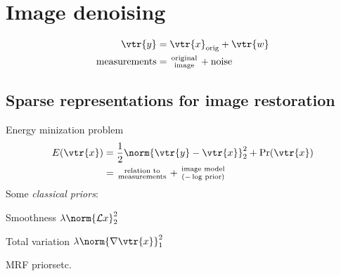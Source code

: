 \chapter{Image denoising}
\begin{align*}
	\vtr{y}&=\vtr{x}_{\text{orig}}+\vtr{w}\\
	\text{measurements}&=
	\begin{smallmatrix}
		\text{original}\\
		\text{image}
	\end{smallmatrix}
	+\text{noise}
\end{align*}
\section{Sparse representations for image restoration}
\begin{compactdesc}
\item[\lp{MAP estimation}] Energy minization problem
	\begin{align*}
		E(\vtr{x})&=\frac{1}{2}\norm{\vtr{y}-\vtr{x}}_2^2+\Pr(\vtr{x})\\
		&=
		\begin{smallmatrix}
			\text{relation to}\\
			\text{measurements}
		\end{smallmatrix}+
		\begin{smallmatrix}
			\text{image model}\\
			\text{($-\log$ prior)}
		\end{smallmatrix}
	\end{align*}
	Some \emph{classical priors}:\\
	\begin{enumerate*}[label=\protect\circled{\arabic*},itemjoin=]
		\item Smoothness $\lambda\norm{\mathcal{L}x}_2^2$\\
		\item Total variation $\lambda\norm{\nabla \vtr{x}}_{1}^{2}$\\
		\item MRF priors\qquad etc.
	\end{enumerate*}

\end{compactdesc}

